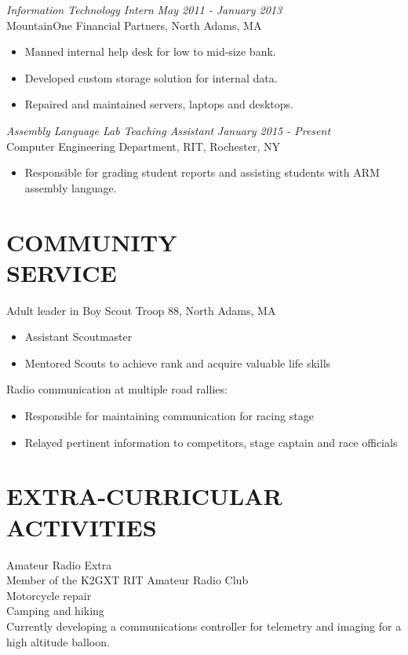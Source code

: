\documentclass[line,margin]{res}
\begin{document}
\begin{resume}
	{\sl Information Technology Intern} \hfill {\sl May 2011 - January 2013} \\
		MountainOne Financial Partners, North Adams, MA
		\begin{itemize}  \itemsep -2pt %
			\item Manned internal help desk for low to mid-size bank.
			\item Developed custom storage solution for internal data.
			\item Repaired and maintained servers, laptops and desktops. 
		\end{itemize} 

		{\sl Assembly Language Lab Teaching Assistant } \hfill {\sl January 2015 - Present} \\
		Computer Engineering Department, RIT, Rochester, NY
		\begin{itemize}  \itemsep -2pt %
			\item Responsible for grading student reports and assisting students with ARM assembly language. 
		\end{itemize} 
 
\section{COMMUNITY \\ SERVICE}  
	Adult leader in Boy Scout Troop 88, North Adams, MA
	\begin{itemize}  \itemsep -2pt %
		\item Assistant Scoutmaster
		\item Mentored Scouts to achieve rank and acquire valuable life skills%
	\end{itemize}
	Radio communication at multiple road rallies:
	\begin{itemize}  \itemsep -2pt %
		\item Responsible for maintaining communication for racing stage
		\item Relayed pertinent information to competitors, stage captain and race officials
	\end{itemize}

\section{EXTRA-CURRICULAR \\ ACTIVITIES}             
	Amateur Radio Extra\\
	Member of the K2GXT RIT Amateur Radio Club\\
	Motorcycle repair\\
	Camping and hiking\\
	Currently developing a communications controller for telemetry and imaging for a high altitude balloon. \\


\end{resume}
\end{document}
